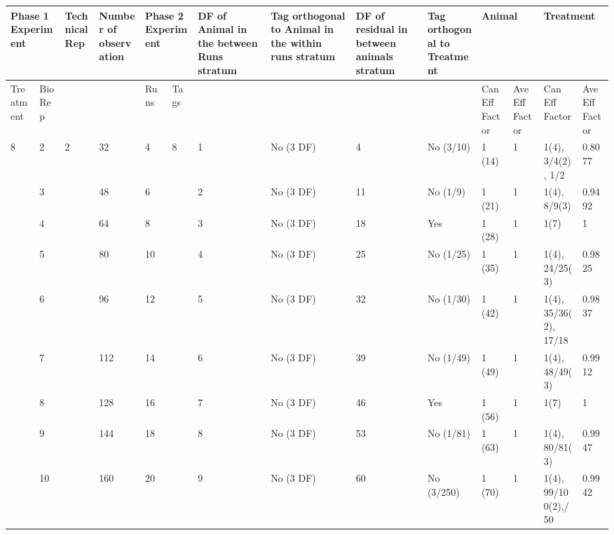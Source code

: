 \begin{tabular}{|p{0.5in}|p{0.3in}|p{0.5in}|p{0.7in}|p{0.3in}|p{0.3in}|p{0.7in}|p{0.7in}|p{0.6in}|p{0.6in}|p{0.4in}|p{0.4in}|p{0.6in}|p{0.4in}|} \hline 
\multicolumn{2}{|p{1in}|}{Phase 1 Experiment} & Technical Rep & Number of observation  & \multicolumn{2}{|p{0.7in}|}{Phase 2 Experiment} & DF of Animal in the between Runs stratum  & Tag orthogonal to Animal in the within runs stratum & DF of residual in between animals stratum & Tag orthogonal to Treatment & \multicolumn{2}{|p{0.8in}|}{Animal} & \multicolumn{2}{|p{1.0in}|}{Treatment} \\ \hline 
Treatment & Bio Rep &  &  & Runs & Tags  &  &  &  &  & Can Eff Factor & Ave Eff Factor & Can Eff Factor & Ave Eff Factor \\ \hline 
8 & 2 & 2 & 32 & 4 & 8 & 1 & No (3 DF) & 4 & No (3/10) & 1 (14) & 1 & 1(4), 3/4(2), 1/2 & 0.8077 \\ \hline 
 & 3 &  & 48 & 6 &  & 2 & No (3 DF) & 11 & No (1/9) & 1 (21) & 1 & 1(4), 8/9(3) & 0.9492 \\ \hline 
 & 4 &  & 64 & 8 &  & 3 & No (3 DF) & 18 & Yes & 1 (28) & 1 & 1(7) & 1 \\ \hline 
 & 5 &  & 80 & 10 &  & 4 & No (3 DF) & 25 & No (1/25) & 1 (35) & 1 & 1(4), 24/25(3)  & 0.9825 \\ \hline 
 & 6 &  & 96 & 12 &  & 5 & No (3 DF) & 32 & No (1/30) & 1 (42) & 1 & 1(4), 35/36(2), 17/18 & 0.9837 \\ \hline 
 & 7 &  & 112 & 14 &  & 6 & No (3 DF) & 39 & No (1/49) & 1 (49) & 1 & 1(4), 48/49(3)  & 0.9912 \\ \hline 
 & 8 &  & 128 & 16 &  & 7 & No (3 DF) & 46 & Yes & 1 (56) & 1 & 1(7) & 1 \\ \hline 
 & 9 &  & 144 & 18 &  & 8 & No (3 DF) & 53 & No (1/81) & 1 (63) & 1 & 1(4), 80/81(3) & 0.9947 \\ \hline 
 & 10 &  & 160 & 20 &  & 9 & No (3 DF) & 60 & No (3/250) & 1 (70) & 1 & 1(4), 99/100(2),\newline 49/50 & 0.9942 \\ \hline 
\end{tabular}



\noindent 


